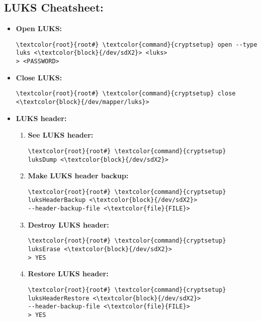 \documentclass[10pt, a4paper, onecolumn, oneside, titlepage, openany]{book}
\begin{document}
\subsection{LUKS Cheatsheet:}
\begin{itemize}
    \item \textbf{Open LUKS:}
\begin{Verbatim}[commandchars=\\\{\}]
\textcolor{root}{root#} \textcolor{command}{cryptsetup} open --type luks <\textcolor{block}{/dev/sdX2}> <luks>
> <PASSWORD>
\end{Verbatim}
    \item \textbf{Close LUKS:}
\begin{Verbatim}[commandchars=\\\{\}]
\textcolor{root}{root#} \textcolor{command}{cryptsetup} close <\textcolor{block}{/dev/mapper/luks}>
\end{Verbatim}
    \item \textbf{LUKS header:}
    \begin{enumerate}
        \item \textbf{See LUKS header:}
\begin{Verbatim}[commandchars=\\\{\}]
\textcolor{root}{root#} \textcolor{command}{cryptsetup} luksDump <\textcolor{block}{/dev/sdX2}>
\end{Verbatim}
        \item \textbf{Make LUKS header backup:}
\begin{Verbatim}[commandchars=\\\{\}]
\textcolor{root}{root#} \textcolor{command}{cryptsetup} luksHeaderBackup <\textcolor{block}{/dev/sdX2}>
--header-backup-file <\textcolor{file}{FILE}>
\end{Verbatim}
        \item \textbf{Destroy LUKS header:}
\begin{Verbatim}[commandchars=\\\{\}]
\textcolor{root}{root#} \textcolor{command}{cryptsetup} luksErase <\textcolor{block}{/dev/sdX2}>
> YES
\end{Verbatim}
        \item \textbf{Restore LUKS header:}
\begin{Verbatim}[commandchars=\\\{\}]
\textcolor{root}{root#} \textcolor{command}{cryptsetup} luksHeaderRestore <\textcolor{block}{/dev/sdX2}>
--header-backup-file <\textcolor{file}{FILE}>
> YES
\end{Verbatim}

\end{enumerate}
\end{itemize}
\end{document}
